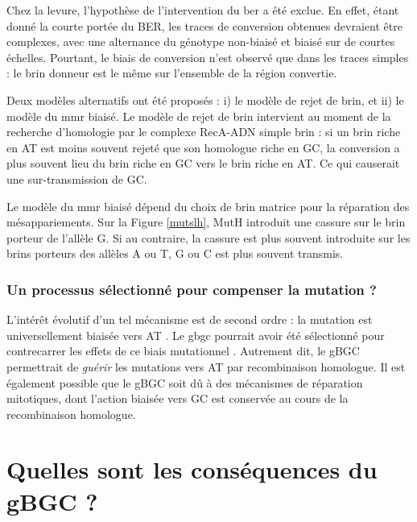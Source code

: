 \documentclass[11pt, oneside]{scrartcl}
\begin{document}
Chez la levure, l'hypothèse de l'intervention du \ac{ber} a été
exclue\cite{lesecque_gc-biased_2013}. En effet, étant donné la courte portée du
BER, les traces de conversion obtenues devraient être complexes, avec une
alternance du génotype non-biaisé et biaisé sur de courtes échelles. Pourtant,
le biais de conversion n'est observé que dans les traces simples : le brin
donneur est le même sur l'ensemble de la région convertie.

Deux modèles alternatifs ont été proposés\cite{lesecque_gc-biased_2013} : i) le
modèle de rejet de brin, et ii) le modèle du \ac{mmr} biaisé. Le modèle de rejet
de brin intervient au moment de la recherche d'homologie par le complexe
RecA-ADN simple brin : si un brin riche en AT est moins souvent rejeté que son
homologue riche en GC, la conversion a plus souvent lieu du brin riche en GC
vers le brin riche en AT. Ce qui causerait une sur-transmission de GC. 

Le modèle du \ac{mmr} biaisé dépend du choix de brin matrice pour la réparation
des mésappariements. Sur la Figure \ref{mutslh}, MutH introduit une cassure sur
le brin porteur de l'allèle G. Si au contraire, la cassure est plus souvent
introduite sur les brins porteurs des allèles A ou T, G ou C est plus souvent
transmis. 

\subsubsection*{Un processus sélectionné pour compenser la mutation ?}
\label{sec:orgheadline10}

L'intérêt évolutif d'un tel mécanisme est de second ordre : la mutation est
universellement biaisée vers AT \cite{lynch_rate_2010,hershberg_evidence_2010}.
Le \ac{gbgc} pourrait avoir été sélectionné pour contrecarrer les effets de ce
biais mutationnel \cite{marais_biased_2003, birdsell_integrating_2002}.
Autrement dit, le gBGC permettrait de \emph{guérir} les mutations vers AT par
recombinaison homologue. Il est également possible que le gBGC soit dû à des
mécanismes de réparation mitotiques, dont l'action biaisée vers GC est conservée
au cours de la recombinaison homologue\cite{duret_biased_2009}.

\section{Quelles sont les conséquences du gBGC ?}
\label{sec:orgheadline17}
\end{document}
